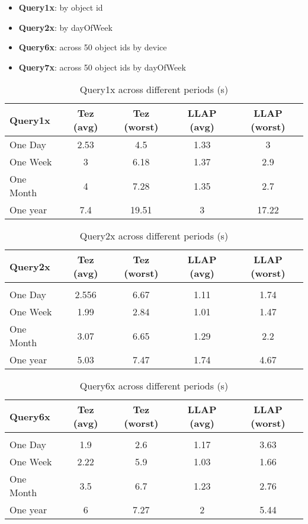 \begin{itemize}
\item \textbf{Query1x}: by object id
\item \textbf{Query2x}: by dayOfWeek
\item \textbf{Query6x}: across 50 object ids by device
\item \textbf{Query7x}: across 50 object ids by dayOfWeek 
\end{itemize}

\begin{table}[h]
\begin{tabular}{l|*{4}c}
Query1x  &   Tez (avg)  &   Tez (worst)  &   LLAP (avg)  &   LLAP (worst) \\
\hline
One Day  &   2.53  &   4.5  &   1.33  &   3 \\
One Week  &   3  &   6.18  &   1.37  &   2.9 \\
One Month  &   4  &   7.28  &   1.35  &   2.7 \\
One year  &   7.4  &   19.51  &   3  &   17.22 \\
\end{tabular}
\caption{Query1x across different periods (s)}
\end{table}

\begin{table}[h]
\begin{tabular}{l|*{4}c}
Query2x  &   Tez (avg)  &   Tez (worst)  &   LLAP (avg)  &   LLAP (worst) \\
\hline \\
One Day  &   2.556  &   6.67  &   1.11  &   1.74 \\
One Week  &   1.99  &   2.84  &   1.01  &   1.47 \\
One Month  &   3.07  &   6.65  &   1.29  &   2.2 \\
One year  &   5.03  &   7.47  &   1.74  &   4.67 \\
\end{tabular}
\caption{Query2x across different periods (s)}
\end{table}

\begin{table}[h]
\begin{tabular}{l|*{4}c}
Query6x  &   Tez (avg)  &   Tez (worst)  &   LLAP (avg)  &   LLAP (worst) \\
\hline \\
One Day  &   1.9  &   2.6  &   1.17  &   3.63 \\
One Week  &   2.22  &   5.9  &   1.03  &   1.66 \\
One Month  &   3.5  &   6.7  &   1.23  &   2.76 \\
One year  &   6  &   7.27  &   2  &   5.44 \\
\end{tabular}
\caption{Query6x across different periods (s)}
\end{table}

